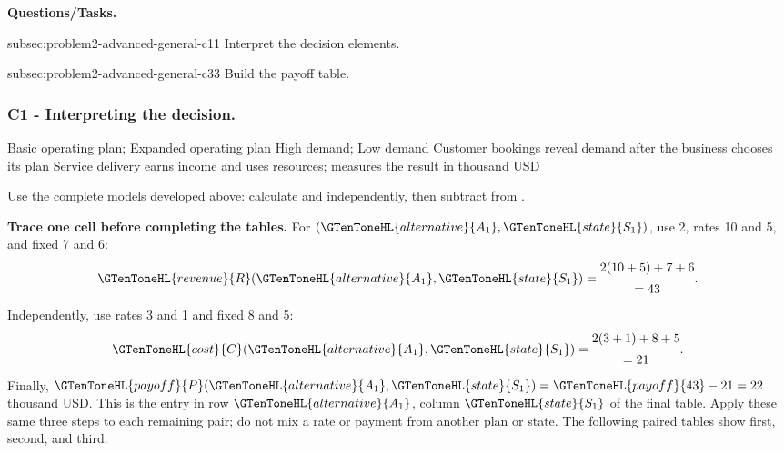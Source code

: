 	\begin{samepage}
	\textbf{Questions/Tasks.}
	\begin{enumerate}
		\CriterionTask
		{subsec:problem2-advanced-general-c1}{1}
		{Interpret the decision elements.}

		\CriterionTask
		{subsec:problem2-advanced-general-c3}{3}
		{Build the payoff table.}
	\end{enumerate}
	\end{samepage}

	\subsubsection*{C1 - Interpreting the decision.}
	\label{subsec:problem2-advanced-general-c1}

	\DecisionElementsTable
	{Basic operating plan; Expanded operating plan}
	{High demand; Low demand}
	{Customer bookings reveal demand after the business chooses its plan}
	{Service delivery earns income and uses resources;  measures the result in thousand USD}

Use the complete models developed above: calculate  and  independently,
then subtract  from .

\textbf{Trace one cell before completing the tables.} For \((\GTenToneHL{alternative}{A_1},\GTenToneHL{state}{S_1})\),
use  2,  rates 10 and 5, and fixed  7 and 6:
\[
\GTenToneHL{revenue}{R}(\GTenToneHL{alternative}{A_1},\GTenToneHL{state}{S_1})=\begin{gathered}2(10+5)+7+6\\[2pt]=43\end{gathered}.
\]
Independently, use  rates 3 and 1 and fixed  8 and 5:
\[
\GTenToneHL{cost}{C}(\GTenToneHL{alternative}{A_1},\GTenToneHL{state}{S_1})=\begin{gathered}2(3+1)+8+5\\[2pt]=21\end{gathered}.
\]
Finally, \(\GTenToneHL{payoff}{P}(\GTenToneHL{alternative}{A_1},\GTenToneHL{state}{S_1})=\GTenToneHL{payoff}{43}-21=22\) thousand USD. This is the entry in row
\(\GTenToneHL{alternative}{A_1}\), column \(\GTenToneHL{state}{S_1}\) of the final  table. Apply these same three
steps to each remaining pair; do not mix a rate or payment from another
plan or state. The following paired tables show  first,  second,
and  third.


